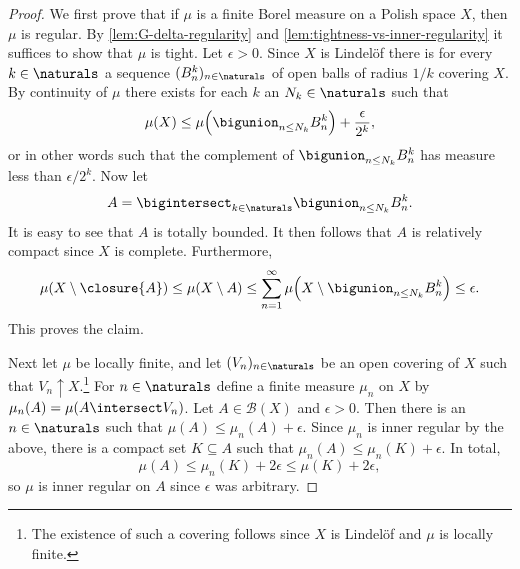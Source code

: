 \documentclass[article, a4paper, 11pt, oneside]{memoir}
\numberwithin{equation}{chapter}
\newcommand{\calB}{\mathcal{B}}
\newcommand{\borel}[1]{\calB(#1)}
\begin{document}
\begin{proof}
    We first prove that if $\mu$ is a finite Borel measure on a Polish space $X$, then $\mu$ is regular. By \cref{lem:G-delta-regularity} and \cref{lem:tightness-vs-inner-regularity} it suffices to show that $\mu$ is tight. Let $\epsilon > 0$. Since $X$ is Lindelöf there is for every $k \in \naturals$ a sequence $(B_n^k)_{n \in \naturals}$ of open balls of radius $1/k$ covering $X$. By continuity of $\mu$ there exists for each $k$ an $N_k \in \naturals$ such that
    \begin{equation*}
        \mu(X)
            \leq \mu \Bigl( \bigunion_{n \leq N_k} B_n^k \Bigr) + \frac{\epsilon}{2^k},
    \end{equation*}
    or in other words such that the complement of $\bigunion_{n \leq N_k} B_n^k$ has measure less than $\epsilon/2^k$. Now let
    \begin{equation*}
        A
            = \bigintersect_{k \in \naturals}
              \bigunion_{n \leq N_k} B_n^k.
    \end{equation*}
    It is easy to see that $A$ is totally bounded. It then follows that $A$ is relatively compact since $X$ is complete. Furthermore,
    \begin{equation*}
        \mu(X \setminus \closure{A})
            \leq \mu(X \setminus A)
            \leq \sum_{n=1}^\infty \mu \Bigl( X \setminus \bigunion_{n \leq N_k} B_n^k \Bigr)
            \leq \epsilon.
    \end{equation*}
    This proves the claim.

    Next let $\mu$ be locally finite, and let $(V_n)_{n \in \naturals}$ be an open covering of $X$ such that $V_n \uparrow X$.\footnote{The existence of such a covering follows since $X$ is Lindelöf and $\mu$ is locally finite.} For $n \in \naturals$ define a finite measure $\mu_n$ on $X$ by $\mu_n(A) = \mu(A \intersect V_n)$. Let $A \in \borel{X}$ and $\epsilon > 0$. Then there is an $n \in \naturals$ such that $\mu(A) \leq \mu_n(A) + \epsilon$. Since $\mu_n$ is inner regular by the above, there is a compact set $K \subseteq A$ such that $\mu_n(A) \leq \mu_n(K) + \epsilon$. In total,
    \begin{equation*}
        \mu(A)
            \leq \mu_n(K) + 2\epsilon
            \leq \mu(K) + 2\epsilon,
    \end{equation*}
    so $\mu$ is inner regular on $A$ since $\epsilon$ was arbitrary.


\end{proof}
\end{document}
